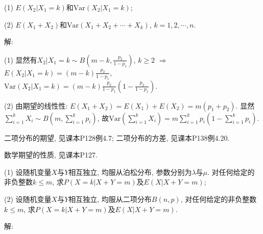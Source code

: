 \documentclass[standard]{ExBook}
\begin{document}
\begin{qitems}
\begin{bbox}
\begin{shaded}
(1) $E(X_2|X_1=k)$和$\mathrm{Var}(X_2|X_1=k)$;

(2) $E(X_1+X_2)$和$\mathrm{Var}(X_1+X_2+\cdots+X_k)$, $k=1,2,\cdots,n$.
    \end{shaded}
    \end{bbox}

\vspace{-5em}

    \begin{bbox}
解: 

(1) 显然有$X_{2}|X_{1}=k\sim B(m-k,\displaystyle\frac{p_2}{1-p_1})$, $k\geq2$ $\Longrightarrow$ $E(X_2|X_1=k)=(m-k)\displaystyle\frac{p_2}{1-p_1}$, $\mathrm{Var}(X_2|X_1=k)=(m-k)\displaystyle\frac{p_2}{1-p_1}\left(1-\frac{p_2}{1-p_1}\right)$.

(2) 由期望的线性性: $E(X_1+X_2)=E(X_1)+E(X_2)=m(p_1+p_2)$. 显然$\displaystyle\sum\limits_{i=1}^{k}X_i\sim B(m,\sum\limits_{i=1}^{k}p_i)$, 故$\displaystyle\mathrm{Var}(\sum\limits_{i=1}^{k}X_i)=m\sum\limits_{i=1}^{k}p_i\left(1-\sum\limits_{i=1}^{k}p_i\right)$.

\textcolor{themeColor}{\selectfont {} 二项分布的期望, 见课本P128例4.7; 二项分布的方差, 见课本P138例4.20.}

\textcolor{themeColor}{\selectfont {} 数学期望的性质, 见课本P127.}
    \end{bbox}

\vspace{-5em}

    \begin{bbox}
    \begin{shaded}
        \qitem
(1) 设随机变量$ X $与$ Y $相互独立, 均服从泊松分布, 参数分别为$\lambda$与$\mu$. 对任何给定的非负整数$k\leq m$, 求$P(X = k|X + Y = m)$及$E(X|X+Y=m)$;

(2) 设随机变量$ X $与$ Y $相互独立, 均服从二项分布$B(n,p)$, 对任何给定的非负整数$k\leq m$, 求$P(X = k|X + Y = m)$及$E(X |X + Y = m)$.
    \end{shaded}
    \end{bbox}

\vspace{-5em}

    \begin{bbox}
解: 


\end{bbox}
\end{qitems}
\end{document}
